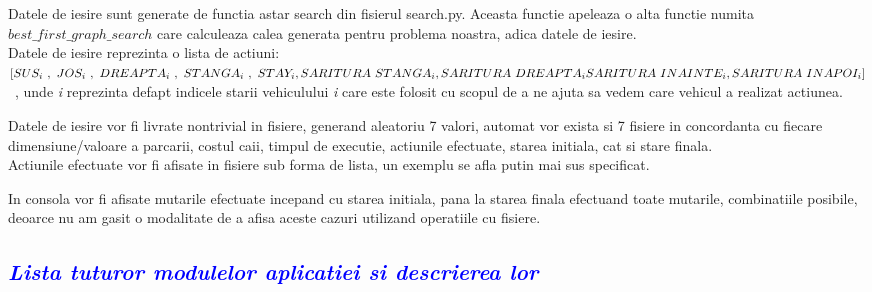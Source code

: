 \documentclass{article}
\begin{document}
\begin{flushleft}
\quad Datele de iesire sunt generate de functia astar search din fisierul search.py. Aceasta functie apeleaza o alta functie numita $best\_first\_graph\_search$ care calculeaza calea generata pentru problema noastra, adica datele de iesire.\\
\vspace{3mm}
Datele de iesire reprezinta o lista de actiuni:\ \([SUS_i \ ,\ JOS_i \ ,\ DREAPTA_i \ ,\ STANGA_i \ ,\ STAY_i, SARITURA\ STANGA_i, SARITURA\ DREAPTA_i\newline SARITURA\ INAINTE_i, SARITURA\ INAPOI_i]\)\ , unde \emph i reprezinta defapt indicele starii vehiculului \emph i care este folosit cu scopul de a ne ajuta sa vedem care vehicul a realizat actiunea.\\ \par
\vspace{2mm}
\quad Datele de iesire vor fi livrate nontrivial in fisiere, generand aleatoriu 7 valori, automat vor exista si 7 fisiere in concordanta cu fiecare dimensiune/valoare a parcarii, costul caii, timpul de executie, actiunile efectuate, starea initiala, cat si stare finala.\\ Actiunile efectuate vor fi afisate in fisiere sub forma de lista, un exemplu se afla putin mai sus specificat.\\ \par 
\vspace{2mm}
\quad In consola vor fi afisate mutarile efectuate incepand cu starea initiala, pana la starea finala efectuand toate mutarile, combinatiile posibile, deoarce nu am gasit o modalitate de a afisa aceste cazuri utilizand operatiile cu fisiere.\par
\end{flushleft}
\newpage
\begin{flushleft}
    \textcolor{blue}{\subsection{\itshape \textcolor{blue}{Lista tuturor modulelor aplicatiei si descrierea lor}}}
    \vspace{7mm}
\end{flushleft}
\end{document}
